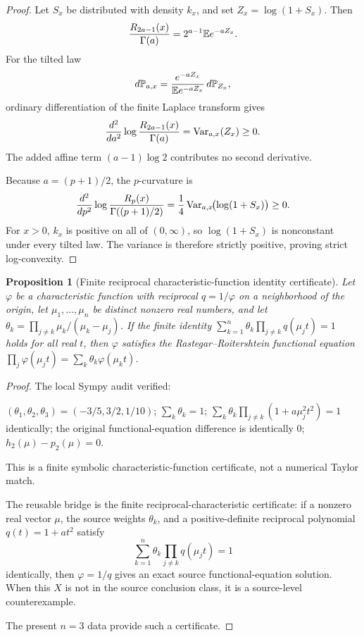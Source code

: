 \documentclass[11pt]{article}
\numberwithin{equation}{section}
\newtheorem{proposition}[theorem]{Proposition}
\theoremstyle{definition}
\theoremstyle{remark}
\newcommand{\1}{\mathbf 1}
\begin{document}
\begin{proof}
Let \(S_x\) be distributed with density \(k_x\), and set \(Z_x=\log(1+S_x)\). Then
\[
{R_{2a-1}(x)\over \Gamma(a)}
=2^{a-1}\mathbb E e^{-aZ_x}.
\]
For the tilted law
\[
d\mathbb P_{a,x}
={e^{-aZ_x}\over \mathbb E e^{-aZ_x}}\,d\mathbb P_{Z_x},
\]
ordinary differentiation of the finite Laplace transform gives
\[
{d^2\over da^2}\log {R_{2a-1}(x)\over \Gamma(a)}
=\operatorname{Var}_{a,x}(Z_x)\ge 0.
\]
The added affine term \((a-1)\log 2\) contributes no second derivative.

Because \(a=(p+1)/2\), the \(p\)-curvature is
\[
{d^2\over dp^2}\log {R_p(x)\over \Gamma((p+1)/2)}
={1\over4}\operatorname{Var}_{a,x}\!\bigl(\log(1+S_x)\bigr)\ge 0.
\]
For \(x>0\), \(k_x\) is positive on all of \((0,\infty)\), so \(\log(1+S_x)\) is nonconstant under every tilted law. The variance is therefore strictly positive, proving strict log-convexity.
\end{proof}

\begin{proposition}[Finite reciprocal characteristic-function identity certificate]
\label{res:reciprocalcharacteristicfunction-finiteidentity-certificate}
Let \(\varphi\) be a characteristic function with reciprocal \(q=1/\varphi\) on a neighborhood of the origin, let \(\mu_1,\ldots,\mu_n\) be distinct nonzero real numbers, and let \(\theta_k=\prod_{j\ne k}\mu_k/(\mu_k-\mu_j)\). If the finite identity \(\sum_{k=1}^n\theta_k\prod_{j\ne k}q(\mu_jt)=1\) holds for all real \(t\), then \(\varphi\) satisfies the Rastegar--Roitershtein functional equation \(\prod_j\varphi(\mu_jt)=\sum_k\theta_k\varphi(\mu_kt)\).
\end{proposition}

\begin{proof}
The local Sympy audit verified:

\((\theta_1,\theta_2,\theta_3)=(-3/5,3/2,1/10)\);
\(\sum_k\theta_k=1\);
\(\sum_k\theta_k\prod_{j\ne k}(1+a\mu_j^2t^2)=1\) identically;
the original functional-equation difference is identically \(0\);
\(h_2(\mu)-p_2(\mu)=0\).

This is a finite symbolic characteristic-function certificate, not a numerical Taylor match.

The reusable bridge is the finite reciprocal-characteristic certificate:
if a nonzero real vector \(\mu\), the source weights \(\theta_k\), and a positive-definite reciprocal polynomial \(q(t)=1+a t^2\) satisfy
\[
\sum_{k=1}^n\theta_k\prod_{j\ne k}q(\mu_jt)=1
\]
identically, then \(\varphi=1/q\) gives an exact source functional-equation solution. When this \(X\) is not in the source conclusion class, it is a source-level counterexample.

The present \(n=3\) data provide such a certificate.
\end{proof}
\end{document}
